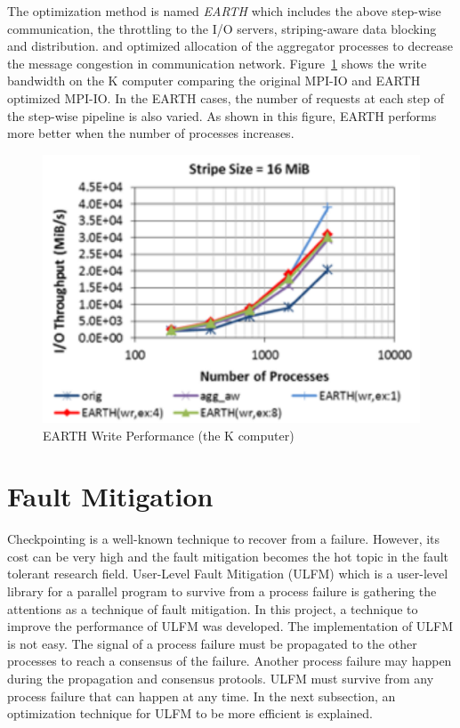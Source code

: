 The optimization method is named {\em EARTH} which includes the above
step-wise communication, the throttling to the I/O servers,
striping-aware data blocking and distribution. and 
optimized allocation of the aggregator processes to decrease the message
congestion in communication network. Figure~\ref{fig:earth} shows the
write bandwidth on the K computer comparing the original MPI-IO and
EARTH optimized MPI-IO. In the EARTH cases, the number of requests at
each step of the step-wise pipeline is also varied. As shown in this
figure, EARTH performs more better when the number of processes
increases. 

\begin{figure}[ht]
\begin{center}
\includegraphics[width=0.95\columnwidth]{Figs/EARTH.pdf}
  \caption{EARTH Write Performance (the K computer)}
  \label{fig:earth}
\end{center}
\end{figure}

\section{Fault Mitigation}

Checkpointing is a well-known technique to recover from a
failure. However, its cost can be very high and the fault mitigation
becomes the hot topic in the fault tolerant research field. User-Level
Fault Mitigation (ULFM) which is a user-level 
library for a parallel program to survive from a process failure is
gathering the attentions as a technique of fault mitigation. In this
project, a technique to improve the performance of ULFM was developed.
The implementation of ULFM is not easy. The signal of a process
failure must be propagated to the other processes to reach a consensus
of the failure. Another process failure may happen during the
propagation and consensus protools. ULFM must survive from any
process failure that can happen at any time. In the next subsection,
an optimization technique for ULFM to be more efficient is explained. 


